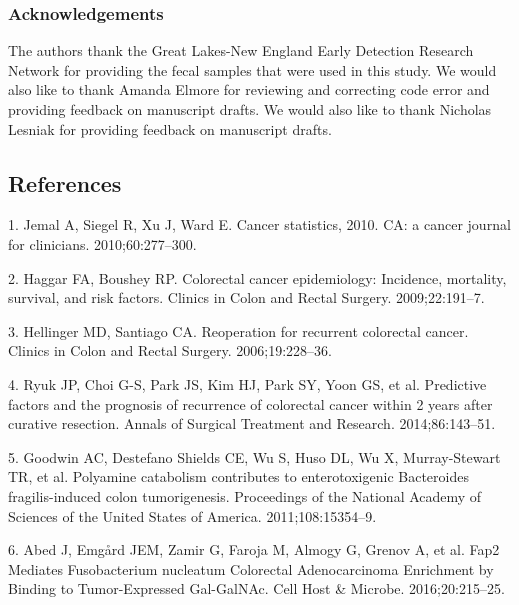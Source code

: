 \documentclass[12pt,]{article}
\begin{document}
\subsubsection{Acknowledgements}\label{acknowledgements}

The authors thank the Great Lakes-New England Early Detection Research
Network for providing the fecal samples that were used in this study. We
would also like to thank Amanda Elmore for reviewing and correcting code
error and providing feedback on manuscript drafts. We would also like to
thank Nicholas Lesniak for providing feedback on manuscript drafts.

\newpage

\subsection*{References}\label{references}

\hypertarget{refs}{}
\hypertarget{ref-jemal_cancer_2010}{}
1. Jemal A, Siegel R, Xu J, Ward E. Cancer statistics, 2010. CA: a
cancer journal for clinicians. 2010;60:277--300.

\hypertarget{ref-haggar_colorectal_2009}{}
2. Haggar FA, Boushey RP. Colorectal cancer epidemiology: Incidence,
mortality, survival, and risk factors. Clinics in Colon and Rectal
Surgery. 2009;22:191--7.

\hypertarget{ref-hellinger_reoperation_2006}{}
3. Hellinger MD, Santiago CA. Reoperation for recurrent colorectal
cancer. Clinics in Colon and Rectal Surgery. 2006;19:228--36.

\hypertarget{ref-ryuk_predictive_2014}{}
4. Ryuk JP, Choi G-S, Park JS, Kim HJ, Park SY, Yoon GS, et al.
Predictive factors and the prognosis of recurrence of colorectal cancer
within 2 years after curative resection. Annals of Surgical Treatment
and Research. 2014;86:143--51.

\hypertarget{ref-goodwin_polyamine_2011}{}
5. Goodwin AC, Destefano Shields CE, Wu S, Huso DL, Wu X, Murray-Stewart
TR, et al. Polyamine catabolism contributes to enterotoxigenic
Bacteroides fragilis-induced colon tumorigenesis. Proceedings of the
National Academy of Sciences of the United States of America.
2011;108:15354--9.

\hypertarget{ref-abed_fap2_2016}{}
6. Abed J, Emgård JEM, Zamir G, Faroja M, Almogy G, Grenov A, et al.
Fap2 Mediates Fusobacterium nucleatum Colorectal Adenocarcinoma
Enrichment by Binding to Tumor-Expressed Gal-GalNAc. Cell Host \&
Microbe. 2016;20:215--25.
\end{document}
